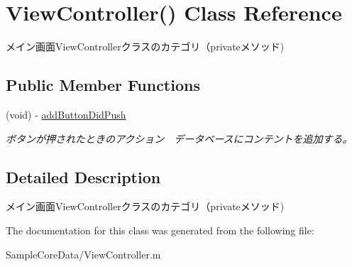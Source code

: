 \hypertarget{interface_view_controller_07_08}{\section{View\-Controller() Class Reference}
\label{interface_view_controller_07_08}
}


メイン画面\-View\-Controllerクラスのカテゴリ（privateメソッド)  


\subsection*{Public Member Functions}
\begin{DoxyCompactItemize}
\item 
\hypertarget{interface_view_controller_07_08_aa039751e3b3d7a8fe9f13ec081b8968c}{(void) -\/ \hyperlink{interface_view_controller_07_08_aa039751e3b3d7a8fe9f13ec081b8968c}{add\-Button\-Did\-Push}}\label{interface_view_controller_07_08_aa039751e3b3d7a8fe9f13ec081b8968c}

\begin{DoxyCompactList}\small\item\em ボタンが押されたときのアクション　データベースにコンテントを追加する。 \end{DoxyCompactList}\end{DoxyCompactItemize}


\subsection{Detailed Description}
メイン画面\-View\-Controllerクラスのカテゴリ（privateメソッド) 

The documentation for this class was generated from the following file\-:\begin{DoxyCompactItemize}
\item 
Sample\-Core\-Data/View\-Controller.\-m\end{DoxyCompactItemize}
